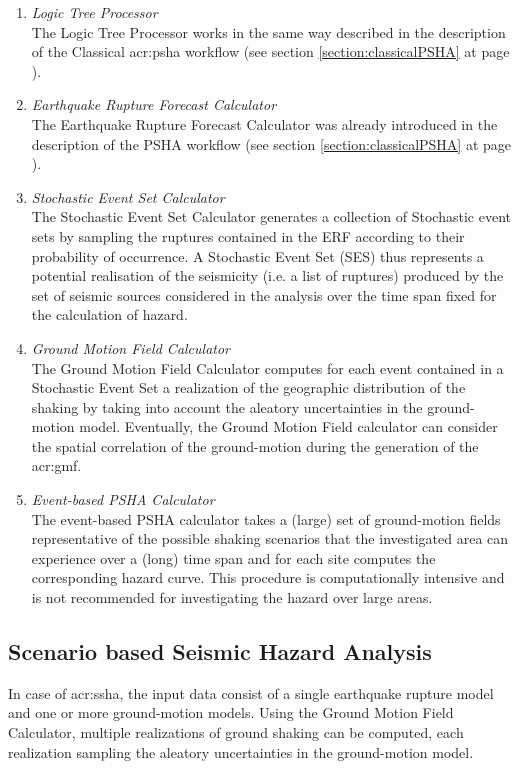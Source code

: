 \begin{enumerate}
%
\item \emph{Logic Tree Processor} \hfill \\
The Logic Tree Processor works in the same way described in 
the description of the Classical \gls{acr:psha} workflow 
(see section \ref{section:classicalPSHA} at page 
\pageref{section:classicalPSHA}).
%
\item \emph{Earthquake Rupture Forecast Calculator} \hfill \\ 
The Earthquake Rupture Forecast Calculator was already 
introduced in the description of the PSHA workflow (see section 
\ref{section:classicalPSHA} at page \pageref{section:classicalPSHA}).
%
\item \emph{Stochastic Event Set Calculator} \hfill \\
The Stochastic Event Set Calculator generates a collection of Stochastic 
event sets by sampling the ruptures contained in the ERF according to their 
probability of occurrence. 
%
A Stochastic Event Set (SES) thus represents a potential realisation of the 
seismicity (i.e. a list of ruptures) produced by the set of seismic sources 
considered in the analysis over the time span fixed for the 
calculation of hazard.
%
\item \emph{Ground Motion Field Calculator} \hfill \\
The Ground Motion Field Calculator computes for each event contained in a 
Stochastic Event Set a realization of the geographic distribution of the 
shaking by taking into account the aleatory uncertainties in 
the ground-motion model. Eventually, the Ground Motion Field calculator 
can consider the spatial correlation of the ground-motion during the 
generation of the \gls{acr:gmf}.
%
\item \emph{Event-based PSHA Calculator} \hfill \\
The event-based PSHA calculator takes a (large) set of ground-motion 
fields representative of the possible shaking scenarios that the investigated
area can experience over a (long) time span and for each 
site computes the corresponding hazard curve.
%
This procedure is computationally intensive and is not recommended for 
investigating the hazard over large areas.
\end{enumerate}
%
\subsection{Scenario based Seismic Hazard Analysis}
\label{section:deterministicSHA}
In case of \gls{acr:ssha}, the input data consist of a single earthquake 
rupture model and one or more ground-motion models. Using the Ground Motion Field 
Calculator, multiple realizations of ground shaking can be computed, each 
realization sampling the aleatory uncertainties in the ground-motion model.

